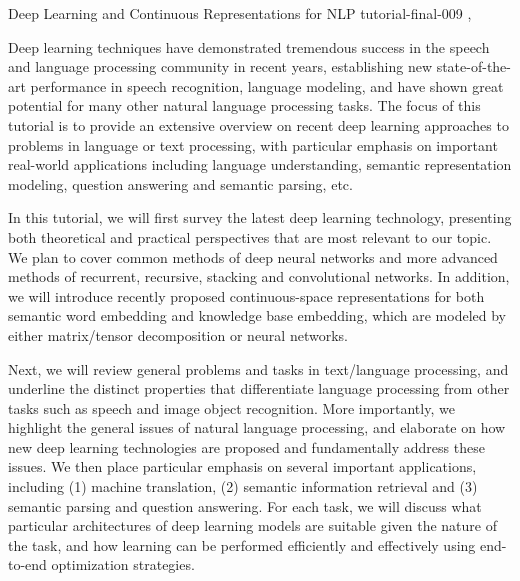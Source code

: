 \begin{tutorial}
  {Deep Learning and Continuous Representations for NLP}
  {tutorial-final-009}
  {\daydateyear, \tutorialafternoontime}
  {\TutLocE}

Deep learning techniques have demonstrated tremendous success in the
speech and language processing community in recent years, establishing
new state-of-the-art performance in speech recognition, language
modeling, and have shown great potential for many other natural
language processing tasks. The focus of this tutorial is to provide an
extensive overview on recent deep learning approaches to problems in
language or text processing, with particular emphasis on important
real-world applications including language understanding, semantic
representation modeling, question answering and semantic parsing, etc.

In this tutorial, we will first survey the latest deep learning
technology, presenting both theoretical and practical perspectives
that are most relevant to our topic. We plan to cover common methods
of deep neural networks and more advanced methods of recurrent,
recursive, stacking and convolutional networks. In addition, we will
introduce recently proposed continuous-space representations for both
semantic word embedding and knowledge base embedding, which are
modeled by either matrix/tensor decomposition or neural networks.

Next, we will review general problems and tasks in text/language
processing, and underline the distinct properties that differentiate
language processing from other tasks such as speech and image object
recognition. More importantly, we highlight the general issues of
natural language processing, and elaborate on how new deep learning
technologies are proposed and fundamentally address these issues. We
then place particular emphasis on several important applications,
including (1) machine translation, (2) semantic information retrieval
and (3) semantic parsing and question answering. For each task, we
will discuss what particular architectures of deep learning models are
suitable given the nature of the task, and how learning can be
performed efficiently and effectively using end-to-end optimization
strategies.

\end{tutorial}
